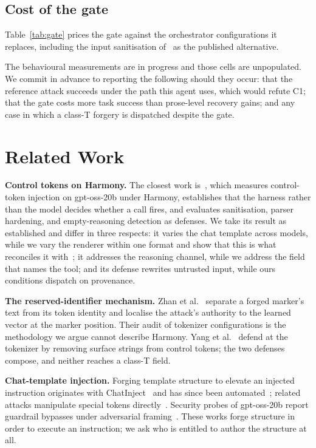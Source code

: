 \documentclass[conference]{IEEEtran}
\begin{document}
\subsection{Cost of the gate}

Table~\ref{tab:gate} prices the gate against the orchestrator configurations it
replaces, including the input sanitisation of~\cite{usama2026controltoken} as
the published alternative.

The behavioural measurements are in progress and those cells are unpopulated.
We commit in advance to reporting the following should they occur: that the
reference attack succeeds under the path this agent uses, which would refute
C1; that the gate costs more task success than prose-level recovery gains; and
any case in which a class-T forgery is dispatched despite the gate.

\section{Related Work}

\textbf{Control tokens on Harmony.} The closest work
is~\cite{usama2026controltoken}, which measures control-token injection on
gpt-oss-20b under Harmony, establishes that the harness rather than the model
decides whether a call fires, and evaluates sanitisation, parser hardening, and
empty-reasoning detection as defenses. We take its result as established and
differ in three respects: it varies the chat template across models, while we
vary the renderer within one format and show that this is what reconciles it
with~\cite{zhan2026samebytes}; it addresses the reasoning channel, while we
address the field that names the tool; and its defense rewrites untrusted input,
while ours conditions dispatch on provenance.

\textbf{The reserved-identifier mechanism.} Zhan et
al.~\cite{zhan2026samebytes} separate a forged marker's text from its token
identity and localise the attack's authority to the learned vector at the marker
position. Their audit of tokenizer configurations is the methodology we argue
cannot describe Harmony. Yang et al.~\cite{yang2026nameless} defend at the
tokenizer by removing surface strings from control tokens; the two defenses
compose, and neither reaches a class-T field.

\textbf{Chat-template injection.} Forging template structure to elevate an
injected instruction originates with ChatInject~\cite{chang2026chatinject} and
has since been automated~\cite{deng2026structural}; related attacks manipulate
special tokens directly~\cite{metabreak2025,badtemplate2026}. Security probes of
gpt-oss-20b report guardrail bypasses under adversarial
framing~\cite{durner2025harmony}. These works forge structure in order to
execute an instruction; we ask who is entitled to author the structure at all.
\end{document}
